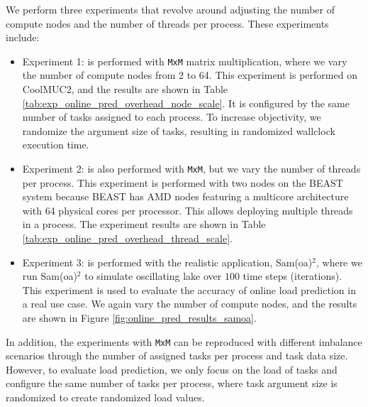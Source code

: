 We perform three experiments that revolve around adjusting the number of compute nodes and the number of threads per process. These experiments include:
\begin{itemize}
	\item Experiment 1: is performed with \texttt{MxM} matrix multiplication, where we vary the number of compute nodes from 2 to 64. This experiment is performed on CoolMUC2, and the results are shown in Table \ref{tab:exp_online_pred_overhead_node_scale}. It is configured by the same number of tasks assigned to each process. To increase objectivity, we randomize the argument size of tasks, resulting in randomized wallclock execution time.  
	\item Experiment 2: is also performed with \texttt{MxM}, but we vary the number of threads per process. This experiment is performed with two nodes on the BEAST system because BEAST has AMD nodes featuring a multicore architecture with 64 physical cores per processor. This allows deploying multiple threads in a process. The experiment results are shown in Table \ref{tab:exp_online_pred_overhead_thread_scale}.
	\item Experiment 3: is performed with the realistic application, Sam(oa)$^2$, where we run Sam(oa)$^2$ to simulate oscillating lake over $100$ time steps (iterations). This experiment is used to evaluate the accuracy of online load prediction in a real use case. We again vary the number of compute nodes, and the results are shown in Figure \ref{fig:online_pred_results_samoa}.
\end{itemize}

In addition, the experiments with \texttt{MxM} can be reproduced with different imbalance scenarios through the number of assigned tasks per process and task data size. However, to evaluate load prediction, we only focus on the load of tasks and configure the same number of tasks per process, where task argument size is randomized to create randomized load values.\\

\begin{table}[t]
\centering
\caption{Evaluation of online load prediction for \texttt{MxM} matrix multiplication over the scale of compute nodes.}
\label{tab:exp_online_pred_overhead_node_scale}
\end{table}

